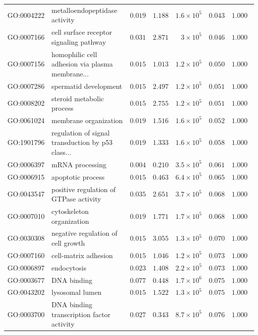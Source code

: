 \documentclass{article}
\begin{document}
\begin{center}
\begin{longtable*}{|l|l|r|r|r|r|r|}
            GO:0004222 & metalloendopeptidase activity & $ 0.019$ & $ 1.188$ & $1.6\times 10^{5}$ & $ 0.043$ & $ 1.000~~$ \\
            GO:0007166 & cell surface receptor signaling pathway & $ 0.031$ & $ 2.871$ & $ 3\times 10^{5}$ & $ 0.046$ & $ 1.000~~$ \\
            GO:0007156 & homophilic cell adhesion via plasma membrane... & $ 0.015$ & $ 1.013$ & $1.2\times 10^{5}$ & $ 0.050$ & $ 1.000~~$ \\
            GO:0007286 & spermatid development & $ 0.015$ & $ 2.497$ & $1.2\times 10^{5}$ & $ 0.051$ & $ 1.000~~$ \\
            GO:0008202 & steroid metabolic process & $ 0.015$ & $ 2.755$ & $1.2\times 10^{5}$ & $ 0.051$ & $ 1.000~~$ \\
            GO:0061024 & membrane organization & $ 0.019$ & $ 1.516$ & $1.6\times 10^{5}$ & $ 0.052$ & $ 1.000~~$ \\
            GO:1901796 & regulation of signal transduction by p53 class... & $ 0.019$ & $ 1.333$ & $1.6\times 10^{5}$ & $ 0.058$ & $ 1.000~~$ \\
            GO:0006397 & mRNA processing & $ 0.004$ & $ 0.210$ & $3.5\times 10^{5}$ & $ 0.061$ & $ 1.000~~$ \\
            GO:0006915 & apoptotic process & $ 0.015$ & $ 0.463$ & $6.4\times 10^{5}$ & $ 0.065$ & $ 1.000~~$ \\
            GO:0043547 & positive regulation of GTPase activity & $ 0.035$ & $ 2.651$ & $3.7\times 10^{5}$ & $ 0.068$ & $ 1.000~~$ \\
            GO:0007010 & cytoskeleton organization & $ 0.019$ & $ 1.771$ & $1.7\times 10^{5}$ & $ 0.068$ & $ 1.000~~$ \\
            GO:0030308 & negative regulation of cell growth & $ 0.015$ & $ 3.055$ & $1.3\times 10^{5}$ & $ 0.070$ & $ 1.000~~$ \\
            GO:0007160 & cell-matrix adhesion & $ 0.015$ & $ 1.046$ & $1.2\times 10^{5}$ & $ 0.073$ & $ 1.000~~$ \\
            GO:0006897 & endocytosis & $ 0.023$ & $ 1.408$ & $2.2\times 10^{5}$ & $ 0.073$ & $ 1.000~~$ \\
            GO:0003677 & DNA binding & $ 0.077$ & $ 0.448$ & $1.7\times 10^{6}$ & $ 0.075$ & $ 1.000~~$ \\
            GO:0043202 & lysosomal lumen & $ 0.015$ & $ 1.522$ & $1.3\times 10^{5}$ & $ 0.075$ & $ 1.000~~$ \\
            GO:0003700 & DNA binding transcription factor activity & $ 0.027$ & $ 0.343$ & $8.7\times 10^{5}$ & $ 0.076$ & $ 1.000~~$ \\

\end{longtable*}
\end{center}
\end{document}
